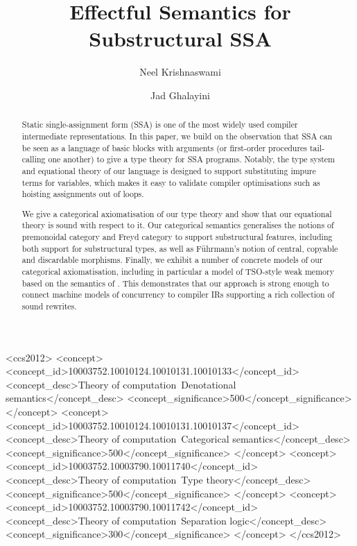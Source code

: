 \documentclass[acmsmall,screen,review]{acmart}
\begin{document}
\title{Effectful Semantics for Substructural SSA}

\author{Neel Krishnaswami}

\author{Jad Ghalayini}

\begin{abstract}
  Static single-assignment form (SSA) is one of the most widely used compiler
  intermediate representations. In this paper, we build on the observation that
  SSA can be seen as a language of basic blocks with arguments (or first-order
  procedures tail-calling one another) to give a type theory for SSA programs.
  Notably, the type system and equational theory of our language is designed to
  support substituting impure terms for variables, which makes it easy to
  validate compiler optimisations such as hoisting assignments out of loops.

  We give a categorical axiomatisation of our type theory and show that our
  equational theory is sound with respect to it. Our categorical semantics
  generalises the notions of premonoidal category and Freyd category to support
  substructural features, including both support for substructural types, as
  well as F\"{u}hrmann's notion of central, copyable and discardable morphisms.
  Finally, we exhibit a number of concrete models of our categorical
  axiomatisation, including in particular a model of TSO-style weak memory based
  on the semantics of \citet{sparky}. This demonstrates that our approach is
  strong enough to connect machine models of concurrency to compiler IRs
  supporting a rich collection of sound rewrites.
\end{abstract}

\begin{CCSXML}
  <ccs2012>
  <concept>
  <concept_id>10003752.10010124.10010131.10010133</concept_id>
  <concept_desc>Theory of computation~Denotational semantics</concept_desc>
  <concept_significance>500</concept_significance>
  </concept>
  <concept>
  <concept_id>10003752.10010124.10010131.10010137</concept_id>
  <concept_desc>Theory of computation~Categorical semantics</concept_desc>
  <concept_significance>500</concept_significance>
  </concept>
  <concept>
  <concept_id>10003752.10003790.10011740</concept_id>
  <concept_desc>Theory of computation~Type theory</concept_desc>
  <concept_significance>500</concept_significance>
  </concept>
  <concept>
  <concept_id>10003752.10003790.10011742</concept_id>
  <concept_desc>Theory of computation~Separation logic</concept_desc>
  <concept_significance>300</concept_significance>
  </concept>
  </ccs2012>
\end{CCSXML}
\end{document}
